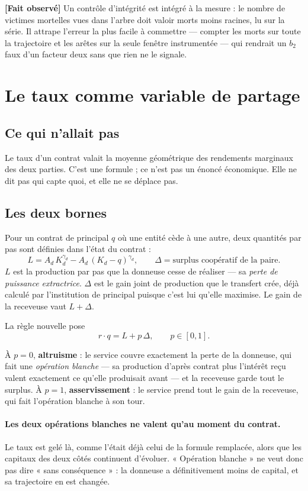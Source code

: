 \documentclass[11pt,a4paper]{article}
\newcommand{\fait}{\textbf{[Fait observé]}}
\begin{document}
\fait{} Un contrôle d'intégrité est intégré à la mesure : le nombre de
victimes mortelles vues dans l'arbre doit valoir morts moins racines, lu sur
la série. Il attrape l'erreur la plus facile à commettre --- compter les
morts sur toute la trajectoire et les arêtes sur la seule fenêtre
instrumentée --- qui rendrait un $b_2$ faux d'un facteur deux sans que rien
ne le signale.

\section{Le taux comme variable de partage}

\subsection{Ce qui n'allait pas}

Le taux d'un contrat valait la moyenne géométrique des rendements marginaux
des deux parties. C'est une formule ; ce n'est pas un énoncé économique. Elle
ne dit pas qui capte quoi, et elle ne se déplace pas.

\subsection{Les deux bornes}

Pour un contrat de principal $q$ où une entité cède à une autre, deux
quantités par pas sont définies dans l'état du contrat :
\[
L = A_d\,K_d^{\gamma_d} - A_d\,(K_d - q)^{\gamma_d},
\qquad
\Delta = \text{surplus coopératif de la paire.}
\]
$L$ est la production par pas que la donneuse cesse de réaliser --- sa
\emph{perte de puissance extractrice}. $\Delta$ est le gain joint de
production que le transfert crée, déjà calculé par l'institution de principal
puisque c'est lui qu'elle maximise. Le gain de la receveuse vaut $L + \Delta$.

La règle nouvelle pose
\[
r \cdot q = L + p\,\Delta, \qquad p \in [0,1].
\]

À $p = 0$, \textbf{altruisme} : le service couvre exactement la perte de la
donneuse, qui fait une \emph{opération blanche} --- sa production d'après
contrat plus l'intérêt reçu valent exactement ce qu'elle produisait avant ---
et la receveuse garde tout le surplus. À $p = 1$,
\textbf{asservissement} : le service prend tout le gain de la receveuse, qui
fait l'opération blanche à son tour.

\paragraph{Les deux opérations blanches ne valent qu'au moment du contrat.}
Le taux est gelé là, comme l'était déjà celui de la formule remplacée, alors
que les capitaux des deux côtés continuent d'évoluer. « Opération blanche »
ne veut donc pas dire « sans conséquence » : la donneuse a définitivement
moins de capital, et sa trajectoire en est changée.
\end{document}
